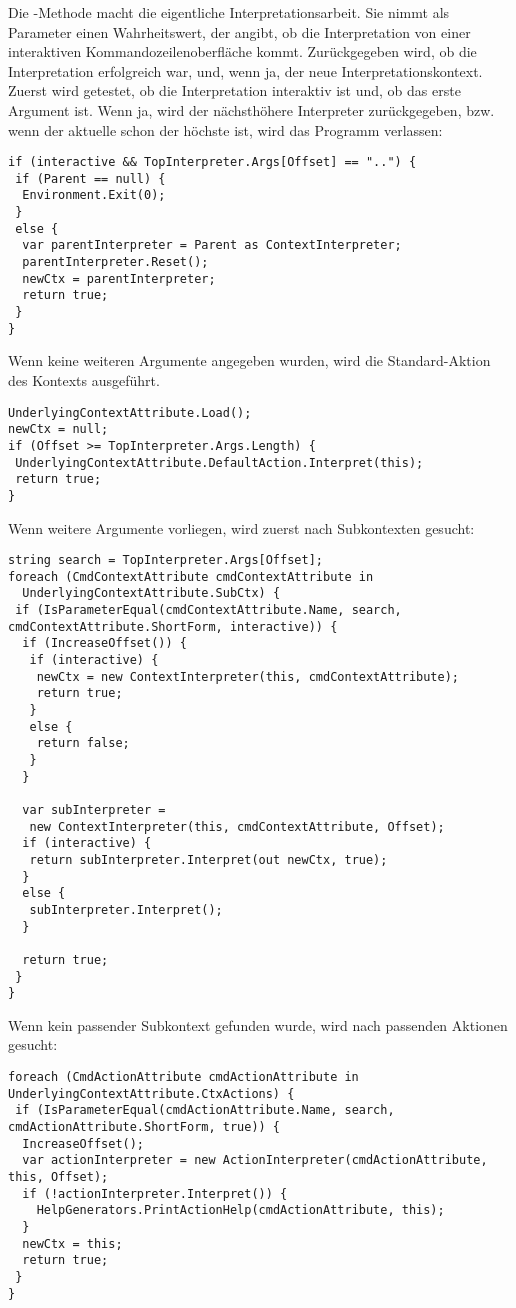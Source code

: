 Die -Methode macht die eigentliche Interpretationsarbeit.
Sie nimmt als Parameter einen Wahrheitswert, der angibt, ob die Interpretation von einer interaktiven Kommandozeilenoberfläche kommt.
Zurückgegeben wird, ob die Interpretation erfolgreich war, und, wenn ja, der neue Interpretationskontext.
Zuerst wird getestet, ob die Interpretation interaktiv ist und, ob das erste Argument  ist.
Wenn ja, wird der  nächsthöhere Interpreter zurückgegeben, bzw. wenn der aktuelle schon der höchste ist, wird das Programm verlassen:
\begin{lstlisting}[title=""]
if (interactive && TopInterpreter.Args[Offset] == "..") {
 if (Parent == null) {
  Environment.Exit(0);
 }
 else {
  var parentInterpreter = Parent as ContextInterpreter;
  parentInterpreter.Reset();
  newCtx = parentInterpreter;
  return true;
 }
}
\end{lstlisting}
Wenn keine weiteren Argumente angegeben wurden, wird die Standard-Aktion des Kontexts ausgeführt.
\begin{lstlisting}[title=""]
UnderlyingContextAttribute.Load();
newCtx = null;
if (Offset >= TopInterpreter.Args.Length) {
 UnderlyingContextAttribute.DefaultAction.Interpret(this);
 return true;
}
\end{lstlisting}
Wenn weitere Argumente vorliegen, wird zuerst nach Subkontexten gesucht:
\begin{lstlisting}[title=""]
string search = TopInterpreter.Args[Offset];
foreach (CmdContextAttribute cmdContextAttribute in 
  UnderlyingContextAttribute.SubCtx) {
 if (IsParameterEqual(cmdContextAttribute.Name, search, cmdContextAttribute.ShortForm, interactive)) {
  if (IncreaseOffset()) {
   if (interactive) {
    newCtx = new ContextInterpreter(this, cmdContextAttribute);
    return true;
   }
   else {
    return false;
   }
  }

  var subInterpreter = 
   new ContextInterpreter(this, cmdContextAttribute, Offset);
  if (interactive) {
   return subInterpreter.Interpret(out newCtx, true);
  }
  else {
   subInterpreter.Interpret();
  }

  return true;
 }
}
\end{lstlisting}
Wenn kein passender Subkontext gefunden wurde, wird nach passenden Aktionen gesucht:
\begin{lstlisting}[title=""]
foreach (CmdActionAttribute cmdActionAttribute in UnderlyingContextAttribute.CtxActions) {
 if (IsParameterEqual(cmdActionAttribute.Name, search, cmdActionAttribute.ShortForm, true)) {
  IncreaseOffset();
  var actionInterpreter = new ActionInterpreter(cmdActionAttribute, this, Offset);
  if (!actionInterpreter.Interpret()) {
  	HelpGenerators.PrintActionHelp(cmdActionAttribute, this);
  }
  newCtx = this;
  return true;
 }
}
\end{lstlisting}
